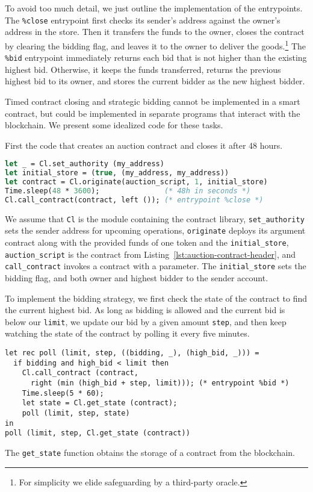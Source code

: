 \documentclass[a4paper]{llncs}
\begin{document}
To avoid too much detail, we just outline the implementation of the entrypoints. The
\lstinline/%close/ entrypoint first checks its sender's address
against the owner's address in the store. Then it transfers the funds
to the owner, closes the contract by clearing the bidding flag, and
leaves it to the owner to deliver the
goods.\footnote{For simplicity we elide safeguarding by a third-party oracle.}
The \lstinline/%bid/ entrypoint immediately returns each bid that is not higher
than the existing highest bid. Otherwise, it keeps the funds
transferred, returns the previous highest bid to its owner, and stores
the current bidder as the new highest bidder.


Timed contract closing and strategic bidding cannot be implemented in
a smart contract, but could be implemented in separate programs that
interact with the blockchain. We present some idealized code for these tasks.

First the code that creates an auction contract and closes it after 48 hours. 
\begin{lstlisting}[language=Caml,numbers=none,basicstyle=\small]
let _ = Cl.set_authority (my_address)
let initial_store = (true, (my_address, my_address))
let contract = Cl.originate(auction_script, 1, initial_store)
Time.sleep(48 * 3600);               (* 48h in seconds *)
Cl.call_contract(contract, left ()); (* entrypoint %close *)
\end{lstlisting}
We assume that \lstinline/Cl/ is the module containing the contract
library, \lstinline{set_authority} sets the sender address for
upcoming operations,  \lstinline/originate/ deploys its argument contract along
with the provided funds of one token and the \lstinline/initial_store/, 
\lstinline{auction_script} is the contract from Listing~\ref{lst:auction-contract-header}, and 
\lstinline{call_contract} invokes a contract with a parameter. The
\lstinline{initial_store} sets the bidding flag, and both owner and
highest bidder to the sender account.


To implement the bidding strategy, we first check the state of the
contract to find the current highest bid. As long as bidding is
allowed and the current bid is below our \lstinline/limit/, we update
our bid by a given amount \lstinline/step/, and then keep watching the state of the contract by
polling it every five minutes. 
\begin{lstlisting}[numbers=none,basicstyle=\small]
let rec poll (limit, step, ((bidding, _), (high_bid, _))) =
  if bidding and high_bid < limit then
    Cl.call_contract (contract, 
      right (min (high_bid + step, limit))); (* entrypoint %bid *)
    Time.sleep(5 * 60);
    let state = Cl.get_state (contract);
    poll (limit, step, state)
in
poll (limit, step, Cl.get_state (contract))
\end{lstlisting}
The \lstinline{get_state} function obtains the storage of a contract from
the blockchain.
\end{document}
